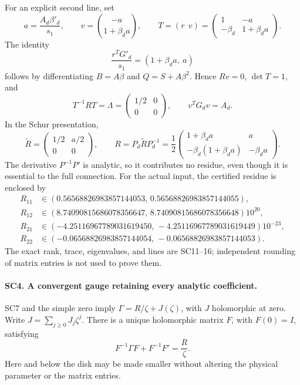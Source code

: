 For an explicit second line, set
\[
 a=\frac{A_d\beta'_d}{s_1},\qquad
 v=\binom{-a}{1+\beta_da},\qquad
 T=(r\ \ v)=
 \begin{pmatrix}1&-a\\-\beta_d&1+\beta_da\end{pmatrix}.
 \tag{SC13}
\]
The identity
\[
 \frac{r^TG'_d}{s_1}=(1+\beta_da,\ a)
 \tag{SC14}
\]
follows by differentiating \(B=A\beta\) and
\(Q=S+A\beta^2\). Hence \(Rv=0\), \(\det T=1\), and
\[
 T^{-1}RT=\Lambda=\begin{pmatrix}1/2&0\\0&0\end{pmatrix},
 \qquad v^TG_dv=A_d.
 \tag{SC15}
\]
In the Schur presentation,
\[
 \widetilde R=
 \begin{pmatrix}1/2&a/2\\0&0\end{pmatrix},\qquad
 R=P_d\widetilde RP_d^{-1}
 =\frac12\begin{pmatrix}
 1+\beta_da&a\\-\beta_d(1+\beta_da)&-\beta_da
 \end{pmatrix}.
 \tag{SC16}
\]
The derivative \(P^{-1}P'\) is analytic, so it contributes no
residue, even though it is essential to the full connection.
For the actual input, the certified residue is enclosed by
\[
\begin{aligned}
 R_{11}&\in(0.56568826983857144053,\,0.56568826983857144055),\\
 R_{12}&\in(8.74090815686078356647,\,8.74090815686078356648)10^{20},\\
 R_{21}&\in(-4.25116967789031619450,\,-4.25116967789031619449)10^{-23},\\
 R_{22}&\in(-0.06568826983857144054,\,-0.06568826983857144053).
\end{aligned}
 \tag{SC17}
\]
The exact rank, trace, eigenvalues, and lines are SC11--16;
independent rounding of matrix entries is not used to prove them.

\paragraph{SC4. A convergent gauge retaining every analytic coefficient.}
SC7 and the simple zero imply
\(\Gamma=R/\zeta+J(\zeta)\), with \(J\) holomorphic at zero.
Write \(J=\sum_{j\ge0}J_j\zeta^j\).
There is a unique holomorphic matrix \(F\), with \(F(0)=I\),
satisfying
\[
 F^{-1}\Gamma F+F^{-1}F'=\frac R\zeta .
 \tag{SC18}
\]
Here and below the disk may be made smaller without altering the
physical parameter or the matrix entries.

